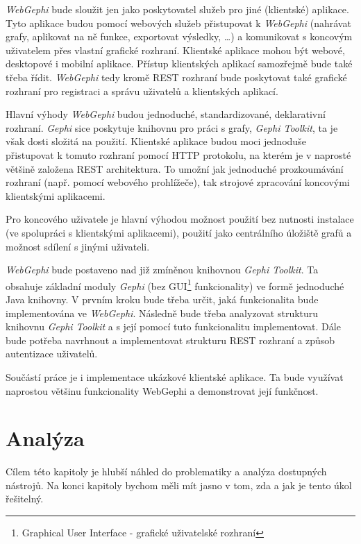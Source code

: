 \documentclass[thesis=M,czech]{FITthesis}[2014/05/6]
\begin{document}
\textit{WebGephi} bude sloužit jen jako poskytovatel služeb pro jiné (klientské) aplikace. Tyto aplikace budou pomocí webových služeb přistupovat k \textit{WebGephi} (nahrávat grafy, aplikovat na ně funkce, exportovat výsledky, \ldots)
a komunikovat s koncovým uživatelem přes vlastní grafické rozhraní. Klientské aplikace mohou být webové, desktopové i mobilní aplikace. Přístup klientských aplikací samozřejmě bude také třeba řídit. 
\textit{WebGephi} tedy kromě REST rozhraní bude poskytovat také grafické rozhraní pro registraci a správu uživatelů a klientských aplikací.

Hlavní výhody \textit{WebGephi} budou jednoduché, standardizované, deklarativní rozhraní. \textit{Gephi} sice poskytuje knihovnu pro práci s grafy, \textit{Gephi Toolkit}\cite{gephi:toolkit}, ta je však dosti složitá na použití. 
Klientské aplikace budou moci jednoduše přistupovat k tomuto rozhraní pomocí HTTP protokolu, na kterém je v naprosté většině založena REST architektura. To umožní jak
jednoduché prozkoumávání rozhraní (např. pomocí webového prohlížeče), tak strojové zpracování koncovými klientskými aplikacemi.

Pro koncového uživatele je hlavní výhodou možnost použití bez nutnosti instalace (ve spolupráci s klientskými aplikacemi), použití jako centrálního úložiště grafů a možnost sdílení s jinými uživateli.

\textit{WebGephi} bude postaveno nad již zmíněnou knihovnou \textit{Gephi Toolkit}. Ta obsahuje základní moduly \textit{Gephi} (bez GUI\footnote{Graphical User Interface - grafické uživatelské rozhraní} funkcionality) ve formě jednoduché Java knihovny.
V prvním kroku bude třeba určit, jaká funkcionalita bude implementována ve \textit{WebGephi}. Následně bude třeba analyzovat strukturu knihovnu \textit{Gephi Toolkit} a s její pomocí tuto funkcionalitu implementovat.
Dále bude potřeba navrhnout a implementovat strukturu REST rozhraní a způsob autentizace uživatelů.

Součástí práce je i implementace ukázkové klientské aplikace. Ta bude využívat naprostou většinu funkcionality WebGephi a demonstrovat její funkčnost.


\chapter{Analýza}
Cílem této kapitoly je hlubší náhled do problematiky a analýza dostupných nástrojů. Na konci kapitoly bychom měli mít jasno v tom, zda a jak je tento úkol řešitelný.
\end{document}
